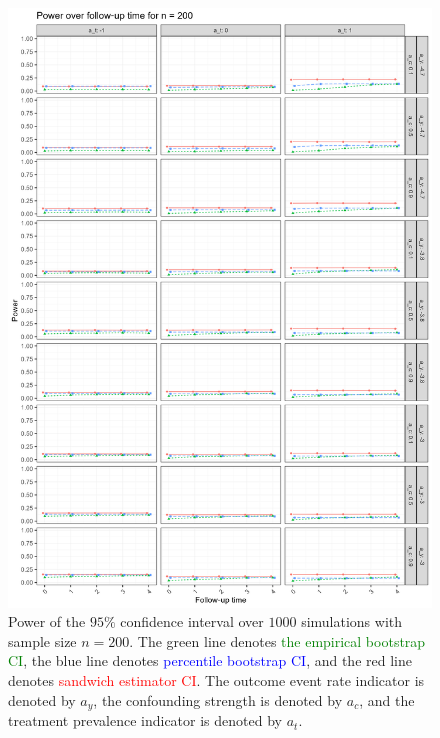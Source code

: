 \documentclass[pdflatex,sn-vancouver-ay]{sn-jnl}%
\theoremstyle{thmstyleone}%
\theoremstyle{thmstyletwo}%
\theoremstyle{thmstylethree}%
\begin{document}
\begin{appendices}
\begin{figure}[H]
\centering
\includegraphics[height=0.95\textheight]{plots/plots_power200.png}
\caption{Power of the $95\%$ confidence interval over $1000$ simulations with sample size $n = 200$. The green line denotes \textcolor{green}{the empirical bootstrap CI}, the blue line denotes \textcolor{blue}{percentile bootstrap CI}, and the red line denotes \textcolor{red}{sandwich estimator CI}. The outcome event rate indicator is denoted by $a_y$, the confounding strength is denoted by $a_c$, and the treatment prevalence indicator is denoted by $a_t$.}
\label{plt:power200}
\end{figure}

\newpage


\end{appendices}
\end{document}
